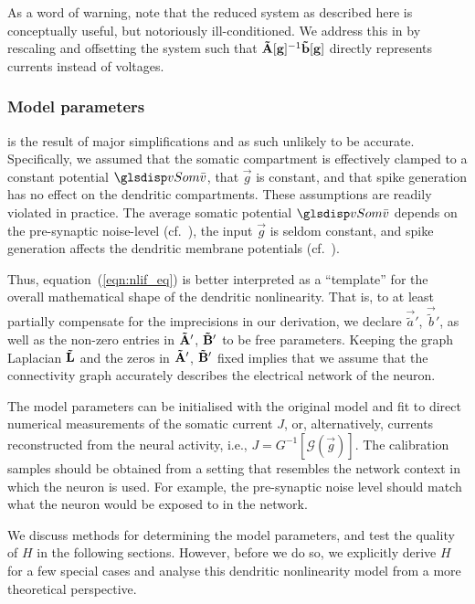 As a word of warning, note that the reduced system as described here is conceptually useful, but notoriously ill-conditioned. 
We address this in  by rescaling and offsetting the system such that $\mathbf{\tilde A}[\mathbf{g}]^{-1} \mathbf{\tilde b}[\mathbf{g}]$ directly represents currents instead of voltages.

\subsubsection{Model parameters}
 is the result of major simplifications and as such unlikely to be accurate.
Specifically, we assumed that the somatic compartment is effectively clamped to a constant potential $\vSom$, that $\vec g$ is constant, and that spike generation has no effect on the dendritic compartments.
These assumptions are readily violated in practice.
The average somatic potential $\vSom$ depends on the pre-synaptic noise-level (cf.~), the input $\vec g$ is seldom constant, and spike generation affects the dendritic membrane potentials (cf.~).

Thus, equation~(\ref{eqn:nlif_eq}) is better interpreted as a \enquote{template} for the overall mathematical shape of the dendritic nonlinearity.
That is, to at least partially compensate for the imprecisions in our derivation, we declare $\vec{\tilde a}'$, $\vec{\tilde b}'$, as well as the non-zero entries in $\mathbf{\tilde A}'$, $\mathbf{\tilde B}'$ to be free parameters.
Keeping the graph Laplacian $\mathbf{\tilde L}$ and the zeros in $\mathbf{\tilde A'}$, $\mathbf{\tilde B'}$ fixed implies that we assume that the connectivity graph accurately describes the electrical network of the neuron.


The model parameters can be initialised with the original model and fit to direct numerical measurements of the somatic current $J$, or, alternatively, currents reconstructed from the neural activity, i.e., $J = G^{-1}[\mathscr{G}(\vec g)]$.
The calibration samples should be obtained from a setting that resembles the network context in which the neuron is used.
For example, the pre-synaptic noise level should match what the neuron would be exposed to in the network.

We discuss methods for determining the model parameters, and test the quality of $H$ in the following sections.
However, before we do so, we explicitly derive $H$ for a few special cases and analyse this dendritic nonlinearity model from a more theoretical perspective.


